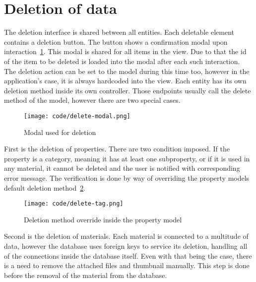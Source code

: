 \documentclass[
  digital,     %
  oneside,     %
  nosansbold,  %
  colorbold, %
  lof,         %
  lot,         %
]{fithesis4}
\begin{document}
\section{Deletion of data}

The deletion interface is shared between all entities. Each deletable element contains a deletion button. The button shows a confirmation modal upon interaction~\ref{fig:delete-modal}. This modal is shared for all items in the view. Due to that the id of the item to be deleted is loaded into the modal after each such interaction. The deletion action can be set to the model during this time too, however in the application's case, it is always hardcoded into the view. Each entity has its own deletion method inside its own controller. Those endpoints usually call the delete method of the model, however there are two special cases.

\begin{figure}[!htbp]
	\begin{center}
		\begin{minipage}{.6\textwidth}
			\texttt{[image: code/delete-modal.png]}
		\end{minipage}
	\end{center}
	\caption{Modal used for deletion}
	\label{fig:delete-modal}
\end{figure}

First is the deletion of properties. There are two condition imposed. If the property is a category, meaning it has at least one subproperty, or if it is used in any material, it cannot be deleted and the user is notified with corresponding error message. The verification is done by way of overriding the property models default deletion method~\ref{fig:delete-tag}.

\begin{figure}[!htbp]
	\begin{center}
		\begin{minipage}{.8\textwidth}
			\texttt{[image: code/delete-tag.png]}
		\end{minipage}
	\end{center}
	\caption{Deletion method override inside the property model}
	\label{fig:delete-tag}
\end{figure}

Second is the deletion of materials. Each material is connected to a multitude of data, however the database uses foreign keys to service its deletion, handling all of the connections inside the database itself. Even with that being the case, there is a need to remove the attached files and thumbnail manually. This step is done before the removal of the material from the database.
\end{document}
